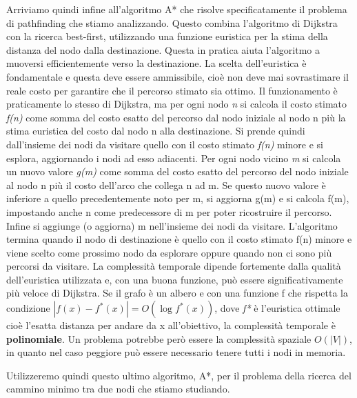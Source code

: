 \documentclass[12pt,a4paper]{report}
\begin{document}
Arriviamo quindi infine all'algoritmo A* che risolve specificatamente il problema di pathfinding che stiamo analizzando.
Questo combina l'algoritmo di Dijkstra con la ricerca best-first, utilizzando una funzione euristica per la stima della distanza del nodo dalla destinazione. 
Questa in pratica aiuta l'algoritmo a muoversi efficientemente verso la destinazione.
La scelta dell'euristica è fondamentale e questa deve essere ammissibile, cioè non deve mai sovrastimare il reale costo per garantire che il percorso stimato sia ottimo.
Il funzionamento è praticamente lo stesso di Dijkstra, ma per ogni nodo \textit{n} si calcola il costo stimato \textit{f(n)} come somma del costo esatto del percorso dal nodo iniziale al nodo n più la stima euristica del costo dal nodo n alla destinazione.
Si prende quindi dall'insieme dei nodi da visitare quello con il costo stimato \textit{f(n)} minore e si esplora, aggiornando i nodi ad esso adiacenti.
Per ogni nodo vicino \textit{m} si calcola un nuovo valore \textit{g(m)} come somma del costo esatto del percorso del nodo iniziale al nodo n più il costo dell'arco che collega n ad m. 
Se questo nuovo valore è inferiore a quello precedentemente noto per m, si aggiorna g(m) e si calcola f(m), impostando anche n come predecessore di m per poter ricostruire il percorso.
Infine si aggiunge (o aggiorna) m nell'insieme dei nodi da visitare.
L'algoritmo termina quando il nodo di destinazione è quello con il costo stimato f(n) minore e viene scelto come prossimo nodo da esplorare oppure quando non ci sono più percorsi da visitare.
La complessità temporale dipende fortemente dalla qualità dell'euristica utilizzata e, con una buona funzione, può essere significativamente più veloce di Dijkstra. Se il grafo è un albero e con una funzione f che rispetta la condizione \textbf{\textit{$|f(x)-f^{*}(x)|=O(\log f^{*}(x))$}}, dove \textit{f*} è l'euristica ottimale cioè l'esatta distanza per andare da x all'obiettivo, la complessità temporale è \textbf{polinomiale}.
Un problema potrebbe però essere la complessità spaziale \textbf{\textit{$O(|V|)$}}, in quanto nel caso peggiore può essere necessario tenere tutti i nodi in memoria.

Utilizzeremo quindi questo ultimo algoritmo, A*, per il problema della ricerca del cammino minimo tra due nodi che stiamo studiando.

\end{document}
